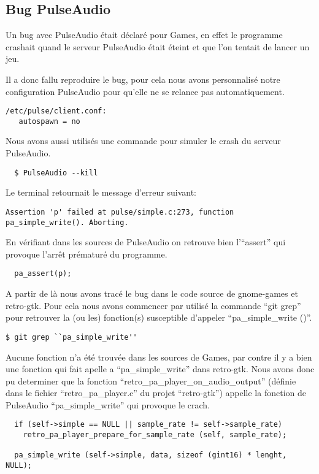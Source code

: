 \documentclass[12pt]{report}
\begin{document}
\subsection{Bug PulseAudio}
Un bug avec PulseAudio était déclaré pour Games, en effet le programme crashait
quand le serveur PulseAudio était éteint et que l'on tentait de lancer
un jeu.

Il a donc fallu reproduire le bug, pour cela nous avons personnalisé notre
configuration PulseAudio pour qu'elle ne se relance pas automatiquement.
\begin{verbatim}
/etc/pulse/client.conf:
   autospawn = no
\end{verbatim}

Nous avons aussi utilisés une commande pour simuler le crash du serveur PulseAudio.
\begin{verbatim}
  $ PulseAudio --kill
\end{verbatim}

Le terminal retournait le message d'erreur suivant:
\begin{verbatim}
Assertion 'p' failed at pulse/simple.c:273, function pa_simple_write(). Aborting.
\end{verbatim}

En vérifiant dans les sources de PulseAudio on retrouve bien l'``assert'' qui provoque
l’arrêt prématuré du programme.
\begin{verbatim}
  pa_assert(p);
\end{verbatim}

A partir de là nous avons tracé le bug dans le code source de gnome-games et retro-gtk.
Pour cela nous avons commencer par utilisé la commande ``git grep'' pour retrouver
la (ou les) fonction(s) susceptible d'appeler ``pa\_simple\_write ()''.
\begin{verbatim}
$ git grep ``pa_simple_write''
\end{verbatim}

Aucune fonction n'a été trouvée dans les sources de Games, par contre il y a bien
une fonction qui fait apelle a ``pa\_simple\_write'' dans retro-gtk.
Nous avons donc pu determiner que la fonction
``retro\_pa\_player\_on\_audio\_output'' (définie dans le fichier
``retro\_pa\_player.c'' du projet ``retro-gtk'') appelle la fonction de PulseAudio
``pa\_simple\_write'' qui provoque le crach.
\begin{verbatim}
  if (self->simple == NULL || sample_rate != self->sample_rate)
    retro_pa_player_prepare_for_sample_rate (self, sample_rate);

  pa_simple_write (self->simple, data, sizeof (gint16) * lenght, NULL);
\end{verbatim}
\end{document}
